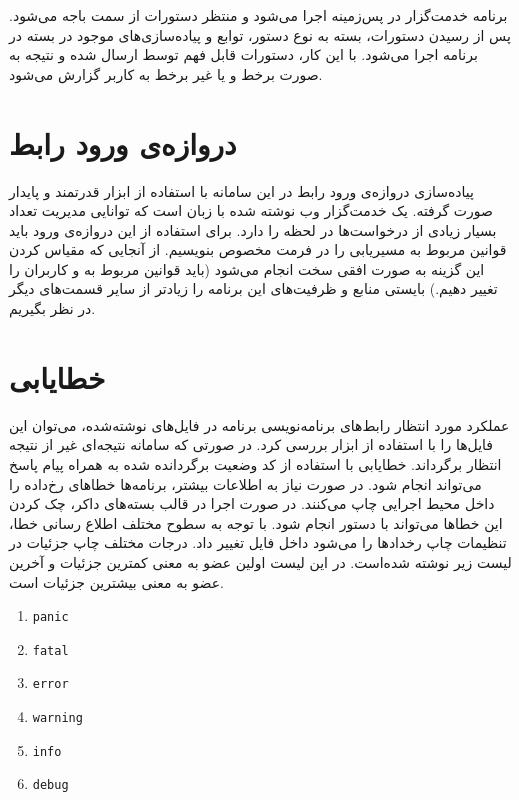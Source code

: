 برنامه خدمت‌گزار در پس‌زمینه اجرا می‌شود و منتظر دستورات از سمت باجه می‌شود. پس از رسیدن دستورات، بسته به نوع دستور، توابع و پیاده‌سازی‌های موجود در بسته  در برنامه اجرا می‌شود. با این کار، دستورات قابل فهم توسط  ارسال شده و نتیجه به صورت برخط و یا غیر برخط به کاربر گزارش می‌شود.


\section{‌دروازه‌ی ورود رابط}
پیاده‌سازی ‌دروازه‌ی ورود رابط در این سامانه با استفاده از ابزار قدرتمند و پایدار  صورت گرفته.  یک خدمت‌گزار وب نوشته شده با زبان  است که توانایی مدیریت تعداد بسیار زیادی از درخواست‌ها در لحظه را دارد. برای استفاده از این ‌دروازه‌ی ورود باید قوانین مربوط به مسیریابی را در فرمت مخصوص بنویسیم. از آنجایی که مقیاس کردن این گزینه به صورت افقی سخت انجام می‌شود (باید قوانین مربوط به  و کاربران را تغییر دهیم.) بایستی منابع و ظرفیت‌های این برنامه‌ را زیاد‌تر از سایر قسمت‌های دیگر در نظر بگیریم.

\section{خطایابی}
عملکرد مورد انتظار رابط‌های برنامه‌نویسی برنامه در فایل‌های  نوشته‌شده، می‌توان این فایل‌ها را با استفاده از ابزار  بررسی کرد. در صورتی که سامانه نتیجه‌ای غیر از نتیجه انتظار برگرداند. خطایابی با استفاده از کد وضعیت برگردانده شده به همراه پیام پاسخ می‌تواند انجام شود. در صورت نیاز به اطلاعات بیشتر، برنامه‌ها خطا‌های رخ‌داده را داخل  محیط اجرایی چاپ می‌کنند. در صورت اجرا در قالب بسته‌های داکر، چک کردن این خطا‌ها می‌تواند با دستور  انجام شود. با توجه به سطوح مختلف اطلاع رسانی خطا، تنظیمات چاپ رخداد‌ها را می‌شود داخل فایل  تغییر داد. درجات مختلف چاپ جزئیات در لیست زیر نوشته شده‌است. در این لیست اولین عضو به معنی کمترین جزئیات و آخرین عضو به معنی بیشترین جزئیات است.

\begin{enumerate}
	\item \texttt{panic}
	\item \texttt{fatal}
	\item \texttt{error}
	\item \texttt{warning}
	\item \texttt{info}
	\item \texttt{debug}
\end{enumerate}


